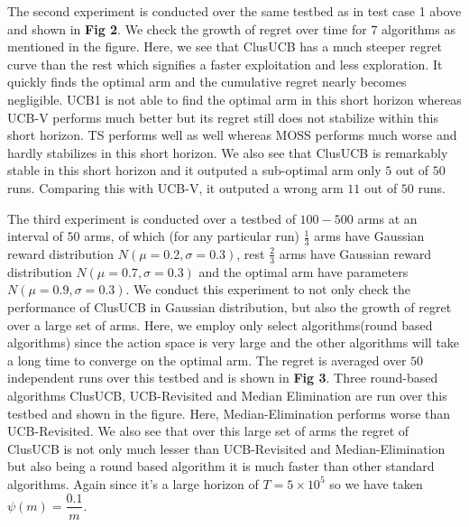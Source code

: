 	The second experiment is conducted over the same testbed as in test case 1 above and shown in \textbf{Fig 2}. We check the growth of regret over time for $7$ algorithms as mentioned in the figure. Here, we see that ClusUCB has a much steeper regret curve than the rest which signifies a faster exploitation and less exploration. It quickly finds the optimal arm and the cumulative regret nearly becomes negligible. UCB1 is not able to find the optimal arm in this short horizon whereas UCB-V performs much better but its regret still does not stabilize within this short horizon. TS performs well as well whereas MOSS performs much worse and hardly stabilizes in this short horizon. We also see that ClusUCB is remarkably stable in this short horizon and it outputed a sub-optimal arm only $5$ out of $50$ runs. Comparing this with UCB-V, it outputed a wrong arm $11$ out of $50$ runs. 

	The third experiment is conducted over a testbed of $100-500$ arms at an interval of $50$ arms, of which (for any particular run) $\frac{1}{3}$ arms have Gaussian reward distribution  $N(\mu =0.2,\sigma =0.3)$, rest $\frac{2}{3}$ arms have Gaussian reward distribution  $N(\mu =0.7,\sigma =0.3)$ and the optimal arm have parameters $N(\mu =0.9,\sigma =0.3)$. We conduct this experiment to not only check the performance of ClusUCB in Gaussian distribution, but also the growth of regret over a large set of arms. Here, we employ only select algorithms(round based algorithms) since the action space is very large and the other algorithms will take a long time to converge on the optimal arm. The regret is averaged over $50$ independent runs over this testbed and is shown in \textbf{Fig 3}. Three round-based algorithms ClusUCB, UCB-Revisited and Median Elimination are run over this testbed and shown in the figure. Here, Median-Elimination performs worse than UCB-Revisited. We also see that over this large set of arms 
the regret of ClusUCB is not only much lesser than UCB-Revisited and Median-Elimination but also being a round based algorithm it is much faster than other standard algorithms. Again since it's a  large horizon of $T=5\times 10^{5}$ so we have taken $\psi(m)=\dfrac{0.1}{m}$.


